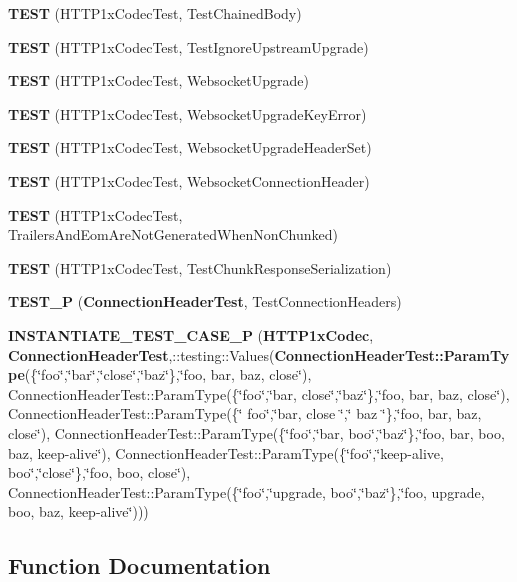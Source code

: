 \begin{DoxyCompactItemize}
{\bf T\+E\+ST} (H\+T\+T\+P1x\+Codec\+Test, Test\+Chained\+Body)
\item 
{\bf T\+E\+ST} (H\+T\+T\+P1x\+Codec\+Test, Test\+Ignore\+Upstream\+Upgrade)
\item 
{\bf T\+E\+ST} (H\+T\+T\+P1x\+Codec\+Test, Websocket\+Upgrade)
\item 
{\bf T\+E\+ST} (H\+T\+T\+P1x\+Codec\+Test, Websocket\+Upgrade\+Key\+Error)
\item 
{\bf T\+E\+ST} (H\+T\+T\+P1x\+Codec\+Test, Websocket\+Upgrade\+Header\+Set)
\item 
{\bf T\+E\+ST} (H\+T\+T\+P1x\+Codec\+Test, Websocket\+Connection\+Header)
\item 
{\bf T\+E\+ST} (H\+T\+T\+P1x\+Codec\+Test, Trailers\+And\+Eom\+Are\+Not\+Generated\+When\+Non\+Chunked)
\item 
{\bf T\+E\+ST} (H\+T\+T\+P1x\+Codec\+Test, Test\+Chunk\+Response\+Serialization)
\item 
{\bf T\+E\+S\+T\+\_\+P} ({\bf Connection\+Header\+Test}, Test\+Connection\+Headers)
\item 
{\bf I\+N\+S\+T\+A\+N\+T\+I\+A\+T\+E\+\_\+\+T\+E\+S\+T\+\_\+\+C\+A\+S\+E\+\_\+P} ({\bf H\+T\+T\+P1x\+Codec}, {\bf Connection\+Header\+Test},\+::testing\+::\+Values({\bf Connection\+Header\+Test\+::\+Param\+Type}(\{\char`\"{}foo\char`\"{},\char`\"{}bar\char`\"{},\char`\"{}close\char`\"{},\char`\"{}baz\char`\"{}\},\char`\"{}foo, bar, baz, close\char`\"{}), Connection\+Header\+Test\+::\+Param\+Type(\{\char`\"{}foo\char`\"{},\char`\"{}bar, close\char`\"{},\char`\"{}baz\char`\"{}\},\char`\"{}foo, bar, baz, close\char`\"{}), Connection\+Header\+Test\+::\+Param\+Type(\{\char`\"{} foo\char`\"{},\char`\"{}bar, close \char`\"{},\char`\"{} baz \char`\"{}\},\char`\"{}foo, bar, baz, close\char`\"{}), Connection\+Header\+Test\+::\+Param\+Type(\{\char`\"{}foo\char`\"{},\char`\"{}bar, boo\char`\"{},\char`\"{}baz\char`\"{}\},\char`\"{}foo, bar, boo, baz, keep-\/alive\char`\"{}), Connection\+Header\+Test\+::\+Param\+Type(\{\char`\"{}foo\char`\"{},\char`\"{}keep-\/alive, boo\char`\"{},\char`\"{}close\char`\"{}\},\char`\"{}foo, boo, close\char`\"{}), Connection\+Header\+Test\+::\+Param\+Type(\{\char`\"{}foo\char`\"{},\char`\"{}upgrade, boo\char`\"{},\char`\"{}baz\char`\"{}\},\char`\"{}foo, upgrade, boo, baz, keep-\/alive\char`\"{})))
\end{DoxyCompactItemize}


\subsection{Function Documentation}
